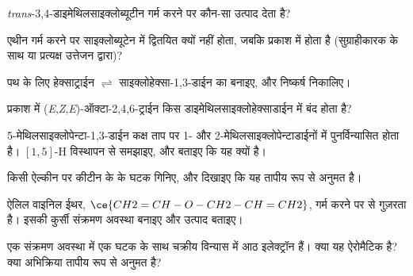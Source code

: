 \begin{exercise}[$\star$]\label{exo:b3:pericyclic:3}
\textit{trans}-3,4-डाइमेथिलसाइक्लोब्यूटीन गर्म करने पर कौन-सा उत्पाद देता है?
\end{exercise}

\begin{exercise}[$\star$]\label{exo:b3:pericyclic:4}
एथीन गर्म करने पर साइक्लोब्यूटेन में द्वितयित क्यों नहीं होता, जबकि प्रकाश में होता है
(सुग्राहीकारक के साथ या प्रत्यक्ष उत्तेजन द्वारा)?
\end{exercise}

\begin{exercise}[$\star\star$]\label{exo:b3:pericyclic:5}
 पथ के लिए हेक्साट्राईन $\rightleftharpoons$ साइक्लोहेक्सा-1,3-डाईन का 
बनाइए, और निष्कर्ष निकालिए।
\end{exercise}

\begin{exercise}[$\star\star$]\label{exo:b3:pericyclic:6}
प्रकाश में (\textit{E},\textit{Z},\textit{E})-ऑक्टा-2,4,6-ट्राईन किस डाइमेथिलसाइक्लोहेक्साडाईन में बंद होता है?
\end{exercise}

\begin{exercise}[$\star\star$]\label{exo:b3:pericyclic:7}
5-मेथिलसाइक्लोपेन्टा-1,3-डाईन कक्ष ताप पर 1- और
2-मेथिलसाइक्लोपेन्टाडाईनों में पुनर्विन्यासित होता है। $[1,5]$-H विस्थापन से समझाइए, और बताइए कि यह  क्यों है।
\end{exercise}

\begin{exercise}[$\star\star$]\label{exo:b3:pericyclic:8}
किसी ऐल्कीन पर कीटीन के  के घटक गिनिए, और दिखाइए
कि यह तापीय रूप से अनुमत है।
\end{exercise}

\begin{exercise}[$\star\star$]\label{exo:b3:pericyclic:9}
ऐलिल वाइनिल ईथर, $\ce{CH2=CH-O-CH2-CH=CH2}$, गर्म करने पर  से
गुज़रता है। इसकी कुर्सी संक्रमण अवस्था बनाइए और उत्पाद बताइए।
\end{exercise}

\begin{exercise}[$\star\star\star$]\label{exo:b3:pericyclic:10}
एक संक्रमण अवस्था में एक  घटक के साथ चक्रीय विन्यास में आठ इलेक्ट्रॉन
हैं। क्या यह ऐरोमैटिक है? क्या अभिक्रिया तापीय रूप से अनुमत है?
\end{exercise}

